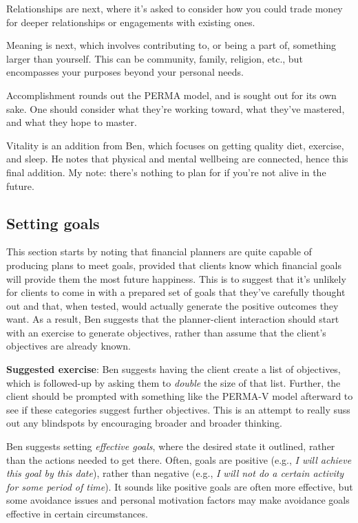 \documentclass{article}
\begin{document}
Relationships are next, where it's asked to consider how you could trade money for deeper relationships or engagements with existing ones.

Meaning is next, which involves contributing to, or being a part of, something larger than yourself.  This can be community, family, religion, etc., but encompasses your purposes beyond your personal needs.

Accomplishment rounds out the PERMA model, and is sought out for its own sake.  One should consider what they're working toward, what they've mastered, and what they hope to master.

Vitality is an addition from Ben, which focuses on getting quality diet, exercise, and sleep.  He notes that physical and mental wellbeing are connected, hence this final addition.  My note: there's nothing to plan for if you're not alive in the future.

\subsection{Setting goals}
This section starts by noting that financial planners are quite capable of producing plans to meet goals, provided that clients know which financial goals will provide them the most future happiness.  This is to suggest that it's unlikely for clients to come in with a prepared set of goals that they've carefully thought out and that, when tested, would actually generate the positive outcomes they want.  As a result, Ben suggests that the planner-client interaction should start with an exercise to generate objectives, rather than assume that the client's objectives are already known.

{\bf Suggested exercise}: Ben suggests having the client create a list of objectives, which is followed-up by asking them to {\it double} the size of that list.  Further, the client should be prompted with something like the PERMA-V model afterward to see if these categories suggest further objectives.  This is an attempt to really suss out any blindspots by encouraging broader and broader thinking.

Ben suggests setting {\it effective goals}, where the desired state it outlined, rather than the actions needed to get there.  Often, goals are positive (e.g., {\it I will achieve this goal by this date}), rather than negative (e.g., {\it I will not do a certain activity for some period of time}).  It sounds like positive goals are often more effective, but some avoidance issues and personal motivation factors may make avoidance goals effective in certain circumstances.
\end{document}
